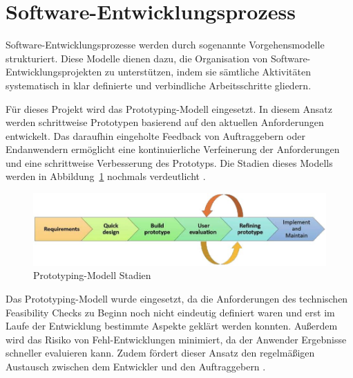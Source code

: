 \section{Software-Entwicklungsprozess}
Software-Entwicklungsprozesse werden durch sogenannte Vorgehensmodelle strukturiert. Diese Modelle dienen dazu, die Organisation von Software-Entwicklungs\-projekten zu unterstützen, indem sie sämtliche Aktivitäten systematisch in klar definierte und verbindliche Arbeitsschritte gliedern.

Für dieses Projekt wird das Prototyping-Modell eingesetzt. In diesem Ansatz werden schrittweise Prototypen basierend auf den aktuellen Anforderungen entwickelt. Das daraufhin eingeholte Feedback von Auftraggebern oder Endanwendern ermöglicht eine kontinuierliche Verfeinerung der Anforderungen und eine schrittweise Verbesserung des Prototyps. Die Stadien dieses Modells werden in Abbildung~\ref{fig:Prototyping-Modell} nochmals verdeutlicht \cite{senarath2021waterfall}.

\begin{figure}[h!]
    \centering
    \includegraphics[]{bilder/Prototyping_Stages.jpg}
    \caption{Prototyping-Modell Stadien \cite{senarath2021waterfall}}
    \label{fig:Prototyping-Modell}
\end{figure}


Das Prototyping-Modell wurde eingesetzt, da die Anforderungen des technischen Feasibility Checks zu Beginn noch nicht eindeutig definiert waren und erst im Laufe der Entwicklung bestimmte Aspekte geklärt werden konnten. Außerdem wird das Risiko von Fehl-Entwicklungen minimiert, da der Anwender Ergebnisse schneller evaluieren kann. Zudem fördert dieser Ansatz den regelmäßigen Austausch zwischen dem Entwickler und den Auftraggebern \cite{senarath2021waterfall}.